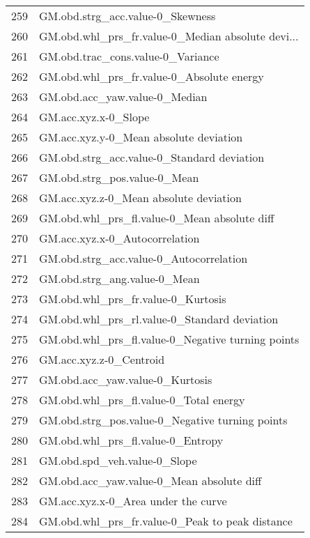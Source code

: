 \begin{tabular}{ll}
259 &                   GM.obd.strg\_acc.value-0\_Skewness \\
260 &  GM.obd.whl\_prs\_fr.value-0\_Median absolute devi... \\
261 &                  GM.obd.trac\_cons.value-0\_Variance \\
262 &          GM.obd.whl\_prs\_fr.value-0\_Absolute energy \\
263 &                      GM.obd.acc\_yaw.value-0\_Median \\
264 &                               GM.acc.xyz.x-0\_Slope \\
265 &             GM.acc.xyz.y-0\_Mean absolute deviation \\
266 &         GM.obd.strg\_acc.value-0\_Standard deviation \\
267 &                       GM.obd.strg\_pos.value-0\_Mean \\
268 &             GM.acc.xyz.z-0\_Mean absolute deviation \\
269 &       GM.obd.whl\_prs\_fl.value-0\_Mean absolute diff \\
270 &                     GM.acc.xyz.x-0\_Autocorrelation \\
271 &            GM.obd.strg\_acc.value-0\_Autocorrelation \\
272 &                       GM.obd.strg\_ang.value-0\_Mean \\
273 &                 GM.obd.whl\_prs\_fr.value-0\_Kurtosis \\
274 &       GM.obd.whl\_prs\_rl.value-0\_Standard deviation \\
275 &  GM.obd.whl\_prs\_fl.value-0\_Negative turning points \\
276 &                            GM.acc.xyz.z-0\_Centroid \\
277 &                    GM.obd.acc\_yaw.value-0\_Kurtosis \\
278 &             GM.obd.whl\_prs\_fl.value-0\_Total energy \\
279 &    GM.obd.strg\_pos.value-0\_Negative turning points \\
280 &                  GM.obd.whl\_prs\_fl.value-0\_Entropy \\
281 &                       GM.obd.spd\_veh.value-0\_Slope \\
282 &          GM.obd.acc\_yaw.value-0\_Mean absolute diff \\
283 &                GM.acc.xyz.x-0\_Area under the curve \\
284 &    GM.obd.whl\_prs\_fr.value-0\_Peak to peak distance \\

\end{tabular}
